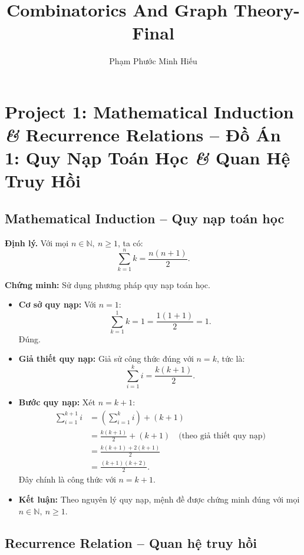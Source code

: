 \documentclass{article}
\title{Combinatorics And Graph Theory-Final}
\author{Phạm Phước Minh Hiếu}
\begin{document}
	\maketitle
	\section*{Project 1: Mathematical Induction {\it\&} Recurrence Relations -- Đồ Án 1: Quy Nạp Toán Học {\it\&} Quan Hệ Truy Hồi}
	
	\subsection{Mathematical Induction -- Quy nạp toán học}
	
	\textbf{Định lý.} Với mọi $n \in \mathbb{N},\ n \ge 1$, ta có:
	\[
	\sum_{k=1}^{n} k = \frac{n(n+1)}{2}.
	\]
	
	\textbf{Chứng minh:} Sử dụng phương pháp quy nạp toán học.
	
	\begin{itemize}[leftmargin=1.5cm]
		\item \textbf{Cơ sở quy nạp:} Với $n = 1$:
		\[
		\sum_{k=1}^{1} k = 1 = \frac{1(1+1)}{2} = 1.
		\]
		Đúng.
		
		\item \textbf{Giả thiết quy nạp:} Giả sử công thức đúng với $n = k$, tức là:
		\[
		\sum_{i=1}^{k} i = \frac{k(k+1)}{2}.
		\]
		
		\item \textbf{Bước quy nạp:} Xét $n = k + 1$:
		\begin{align*}
			\sum_{i=1}^{k+1} i &= \left(\sum_{i=1}^{k} i\right) + (k+1) \\
			&= \frac{k(k+1)}{2} + (k+1) \quad \text{(theo giả thiết quy nạp)}\\
			&= \frac{k(k+1) + 2(k+1)}{2} \\
			&= \frac{(k+1)(k + 2)}{2}.
		\end{align*}
		Đây chính là công thức với $n = k + 1$.
		
		\item \textbf{Kết luận:} Theo nguyên lý quy nạp, mệnh đề được chứng minh đúng với mọi $n \in \mathbb{N},\ n \ge 1$.
	\end{itemize}
	
	\subsection{Recurrence Relation -- Quan hệ truy hồi}
	
\end{document}
